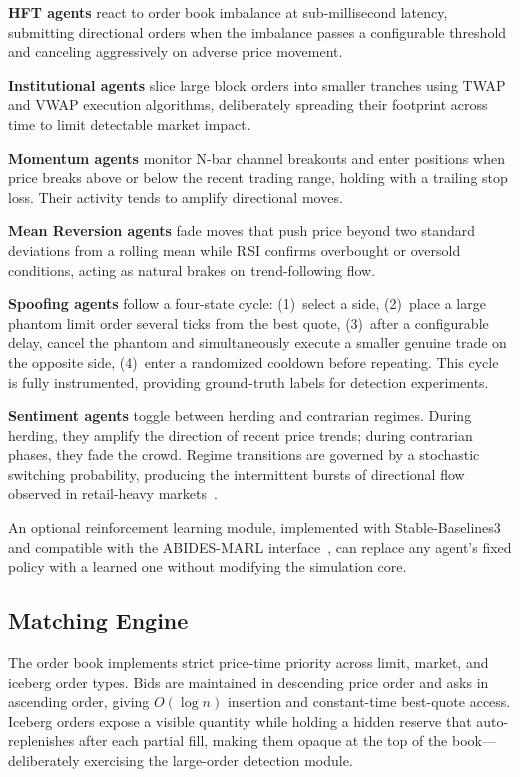 \documentclass[conference]{IEEEtran}
\begin{document}
\textbf{HFT agents} react to order book imbalance at sub-millisecond
latency, submitting directional orders when the imbalance passes a
configurable threshold and canceling aggressively on adverse price
movement.

\textbf{Institutional agents} slice large block orders into smaller
tranches using TWAP and VWAP execution algorithms, deliberately
spreading their footprint across time to limit detectable market
impact.

\textbf{Momentum agents} monitor N-bar channel breakouts and enter
positions when price breaks above or below the recent trading range,
holding with a trailing stop loss. Their activity tends to amplify
directional moves.

\textbf{Mean Reversion agents} fade moves that push price beyond two
standard deviations from a rolling mean while RSI confirms overbought
or oversold conditions, acting as natural brakes on trend-following
flow.

\textbf{Spoofing agents} follow a four-state cycle: (1)~select a
side, (2)~place a large phantom limit order several ticks from the
best quote, (3)~after a configurable delay, cancel the phantom and
simultaneously execute a smaller genuine trade on the opposite side,
(4)~enter a randomized cooldown before repeating. This cycle is fully
instrumented, providing ground-truth labels for detection experiments.

\textbf{Sentiment agents} toggle between herding and contrarian
regimes. During herding, they amplify the direction of recent price
trends; during contrarian phases, they fade the crowd. Regime
transitions are governed by a stochastic switching probability,
producing the intermittent bursts of directional flow observed in
retail-heavy markets~\cite{ref14}.

An optional reinforcement learning module, implemented with
Stable-Baselines3 and compatible with the ABIDES-MARL
interface~\cite{ref4}, can replace any agent's fixed policy with a
learned one without modifying the simulation core.

\subsection{Matching Engine}

The order book implements strict price-time priority across limit,
market, and iceberg order types. Bids are maintained in descending
price order and asks in ascending order, giving $O(\log n)$ insertion
and constant-time best-quote access. Iceberg orders expose a visible
quantity while holding a hidden reserve that auto-replenishes after
each partial fill, making them opaque at the top of the
book---deliberately exercising the large-order detection module.
\end{document}
